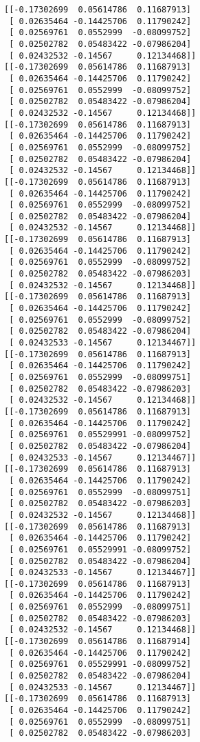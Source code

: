 \documentclass[11pt]{article}
\begin{document}
    \begin{Verbatim}[commandchars=\\\{\}]
[[-0.17302699  0.05614786  0.11687913]
 [ 0.02635464 -0.14425706  0.11790242]
 [ 0.02569761  0.0552999  -0.08099752]
 [ 0.02502782  0.05483422 -0.07986204]
 [ 0.02432532 -0.14567     0.12134468]]
[[-0.17302699  0.05614786  0.11687913]
 [ 0.02635464 -0.14425706  0.11790242]
 [ 0.02569761  0.0552999  -0.08099752]
 [ 0.02502782  0.05483422 -0.07986204]
 [ 0.02432532 -0.14567     0.12134468]]
[[-0.17302699  0.05614786  0.11687913]
 [ 0.02635464 -0.14425706  0.11790242]
 [ 0.02569761  0.0552999  -0.08099752]
 [ 0.02502782  0.05483422 -0.07986204]
 [ 0.02432532 -0.14567     0.12134468]]
[[-0.17302699  0.05614786  0.11687913]
 [ 0.02635464 -0.14425706  0.11790242]
 [ 0.02569761  0.0552999  -0.08099752]
 [ 0.02502782  0.05483422 -0.07986204]
 [ 0.02432532 -0.14567     0.12134468]]
[[-0.17302699  0.05614786  0.11687913]
 [ 0.02635464 -0.14425706  0.11790242]
 [ 0.02569761  0.0552999  -0.08099752]
 [ 0.02502782  0.05483422 -0.07986203]
 [ 0.02432532 -0.14567     0.12134468]]
[[-0.17302699  0.05614786  0.11687913]
 [ 0.02635464 -0.14425706  0.11790242]
 [ 0.02569761  0.0552999  -0.08099752]
 [ 0.02502782  0.05483422 -0.07986204]
 [ 0.02432533 -0.14567     0.12134467]]
[[-0.17302699  0.05614786  0.11687913]
 [ 0.02635464 -0.14425706  0.11790242]
 [ 0.02569761  0.0552999  -0.08099751]
 [ 0.02502782  0.05483422 -0.07986203]
 [ 0.02432532 -0.14567     0.12134468]]
[[-0.17302699  0.05614786  0.11687913]
 [ 0.02635464 -0.14425706  0.11790242]
 [ 0.02569761  0.05529991 -0.08099752]
 [ 0.02502782  0.05483422 -0.07986204]
 [ 0.02432533 -0.14567     0.12134467]]
[[-0.17302699  0.05614786  0.11687913]
 [ 0.02635464 -0.14425706  0.11790242]
 [ 0.02569761  0.0552999  -0.08099751]
 [ 0.02502782  0.05483422 -0.07986203]
 [ 0.02432532 -0.14567     0.12134468]]
[[-0.17302699  0.05614786  0.11687913]
 [ 0.02635464 -0.14425706  0.11790242]
 [ 0.02569761  0.05529991 -0.08099752]
 [ 0.02502782  0.05483422 -0.07986204]
 [ 0.02432533 -0.14567     0.12134467]]
[[-0.17302699  0.05614786  0.11687913]
 [ 0.02635464 -0.14425706  0.11790242]
 [ 0.02569761  0.0552999  -0.08099751]
 [ 0.02502782  0.05483422 -0.07986203]
 [ 0.02432532 -0.14567     0.12134468]]
[[-0.17302699  0.05614786  0.11687914]
 [ 0.02635464 -0.14425706  0.11790242]
 [ 0.02569761  0.05529991 -0.08099752]
 [ 0.02502782  0.05483422 -0.07986204]
 [ 0.02432533 -0.14567     0.12134467]]
[[-0.17302699  0.05614786  0.11687913]
 [ 0.02635464 -0.14425706  0.11790242]
 [ 0.02569761  0.0552999  -0.08099751]
 [ 0.02502782  0.05483422 -0.07986203]

\end{Verbatim}
\end{document}
